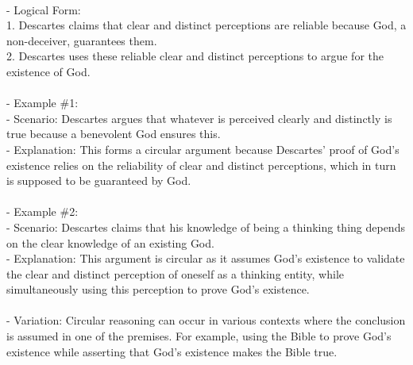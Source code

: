 \documentclass[a4paper,12pt,single,pdftex]{scrartcl}
\begin{document}
    
      
    \\

    
      - Logical Form:
    \\

    
        1. Descartes claims that clear and distinct perceptions are reliable because God, a non-deceiver, guarantees them.
    \\

    
        2. Descartes uses these reliable clear and distinct perceptions to argue for the existence of God.
    \\

    
      
    \\

    
      - Example \#1:
    \\

    
        - Scenario: Descartes argues that whatever is perceived clearly and distinctly is true because a benevolent God ensures this.
    \\

    
        - Explanation: This forms a circular argument because Descartes' proof of God's existence relies on the reliability of clear and distinct perceptions, which in turn is supposed to be guaranteed by God.
    \\

    
      
    \\

    
      - Example \#2:
    \\

    
        - Scenario: Descartes claims that his knowledge of being a thinking thing depends on the clear knowledge of an existing God.
    \\

    
        - Explanation: This argument is circular as it assumes God's existence to validate the clear and distinct perception of oneself as a thinking entity, while simultaneously using this perception to prove God's existence.
    \\

    
      
    \\

    
      - Variation: Circular reasoning can occur in various contexts where the conclusion is assumed in one of the premises. For example, using the Bible to prove God's existence while asserting that God's existence makes the Bible true.
    \\
\end{document}
